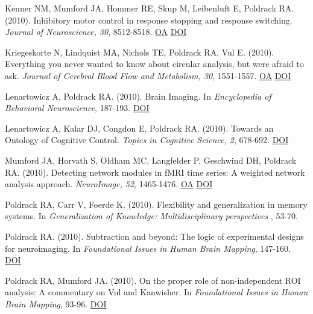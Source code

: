 \documentclass[10pt, letterpaper]{article}
\begin{document}
Kenner NM, Mumford JA, Hommer RE, Skup M, Leibenluft E, Poldrack RA.  (2010). Inhibitory motor control in response stopping and response switching. \textit{Journal of Neuroscience, 30}, 8512-8518. \href{https://www.ncbi.nlm.nih.gov/pmc/articles/PMC2905623}{OA} \href{https://doi.org/10.1523/jneurosci.1096-10.2010}{DOI} \vspace{2mm}

Kriegeskorte N, Lindquist MA, Nichols TE, Poldrack RA, Vul E.  (2010). Everything you never wanted to know about circular analysis, but were afraid to ask. \textit{Journal of Cerebral Blood Flow and Metabolism, 30}, 1551-1557. \href{https://www.ncbi.nlm.nih.gov/pmc/articles/PMC2949251}{OA} \href{https://doi.org/10.1038/jcbfm.2010.86}{DOI} \vspace{2mm}

Lenartowicz A, Poldrack RA.  (2010). Brain Imaging. In \textit{Encyclopedia of Behavioral Neuroscience}, 187-193. \href{https://doi.org/10.1016/b978-0-08-045396-5.00052-x}{DOI} \vspace{2mm}

Lenartowicz A, Kalar DJ, Congdon E, Poldrack RA.  (2010). Towards an Ontology of Cognitive Control. \textit{Topics in Cognitive Science, 2}, 678-692. \href{https://doi.org/10.1111/j.1756-8765.2010.01100.x}{DOI} \vspace{2mm}

Mumford JA, Horvath S, Oldham MC, Langfelder P, Geschwind DH, Poldrack RA.  (2010). Detecting network modules in fMRI time series: A weighted network analysis approach. \textit{NeuroImage, 52}, 1465-1476. \href{https://www.ncbi.nlm.nih.gov/pmc/articles/PMC3632300}{OA} \href{https://doi.org/10.1016/j.neuroimage.2010.05.047}{DOI} \vspace{2mm}

Poldrack RA, Carr V, Foerde K.  (2010). Flexibility and generalization in memory systems. In \textit{Generalization of Knowledge: Multidisciplinary perspectives }, 53-70. \vspace{2mm}

Poldrack RA.  (2010). Subtraction and beyond: The logic of experimental designs for neuroimaging. In \textit{Foundational Issues in Human Brain Mapping}, 147-160. \href{https://doi.org/10.7551/mitpress/9780262014021.001.0001}{DOI} \vspace{2mm}

Poldrack RA, Mumford JA.  (2010). On the proper role of non-independent ROI analysis: A commentary on Vul and Kanwisher. In \textit{Foundational Issues in Human Brain Mapping}, 93-96. \href{https://doi.org/10.7551/mitpress/9780262014021.001.0001}{DOI} \vspace{2mm}
\end{document}
